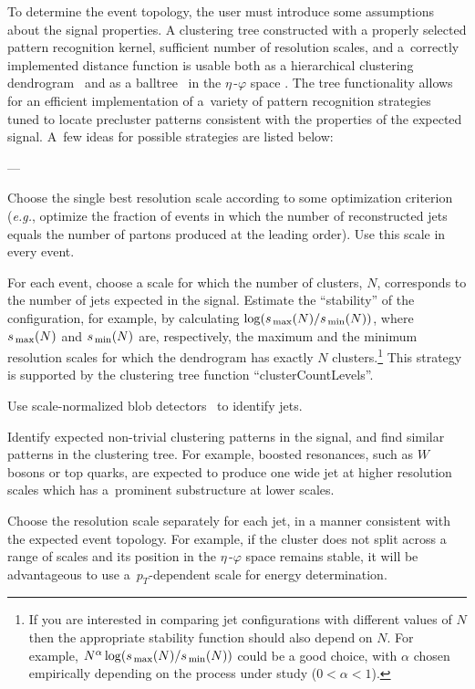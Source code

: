 \documentclass[epsf,12pt,titlepage]{article}
\newcommand{\sub}[1]{\ensuremath{_{\mbox{\scriptsize \,#1}}}}
\def\epspace {$\eta$\,-$\varphi$ space }
\newenvironment{thinlist} {
    \begin{list} {---} {
        \setlength{\topsep}{0.075cm}
        \setlength{\parsep}{0.075cm}
        \setlength{\itemsep}{0.075cm}
    }
} {\end{list}}
\begin{document}
To determine the event topology, the user must introduce
some assumptions about the signal properties.
A clustering tree constructed with a properly selected pattern
recognition kernel, sufficient number of resolution scales,
and a~correctly implemented distance function
is usable both as a hierarchical clustering dendrogram~\cite{ref:dendrogram}
and as a balltree~\cite{ref:balltree} in the \epspace\!\!.
The tree
functionality allows for an efficient implementation
of a~variety of pattern recognition strategies tuned to
locate precluster patterns consistent with the properties
of the expected signal. A~few ideas for
possible strategies are listed below:
\begin{thinlist}
\item Choose the single best resolution scale according to some
      optimization criterion ({\it e.g.}, optimize the fraction
      of events in which the number of reconstructed jets equals
      the number of partons produced at the leading order).
      Use this scale in every event.
\item For each event, choose a scale for which the number of clusters, $N$,
      corresponds to the number of jets expected in the signal. Estimate
      the ``stability'' of the configuration, for example, by calculating
      $\log(s\sub{max}(N)/s\sub{min}(N))$, where $s\sub{max}(N)$ and
      $s\sub{min}(N)$ are, respectively,
      the maximum and the minimum resolution scales for which
      the dendrogram has exactly $N$ clusters.\footnote{If you are interested
      in comparing jet configurations with different values of $N$ then
      the appropriate stability function should also depend on $N$.
      For example, $N^{\alpha} \log(s\sub{max}(N)/s\sub{min}(N))$ could
      be a good choice, with $\alpha$ chosen empirically depending
      on the process under study ($0 < \alpha < 1$).}
      This strategy is supported
      by the clustering tree function ``clusterCountLevels''.
\item Use scale-normalized blob detectors~\cite{ref:blobdetect}
      to identify jets.
\item Identify expected non-trivial clustering patterns in the signal,
      and find similar patterns in the clustering tree. For example,
      boosted resonances, such as $W$ bosons or top quarks,
      are expected to produce one wide jet at higher resolution scales
      which has a~prominent substructure at lower scales.
\item Choose the resolution scale separately for each jet, in a manner
      consistent with the expected event topology. For example, if the cluster
      does not split across a range of scales and its position in the \epspace
      remains stable, it will be advantageous to use a~$p_T$-dependent
      scale for energy determination.
\end{thinlist}
\end{document}
